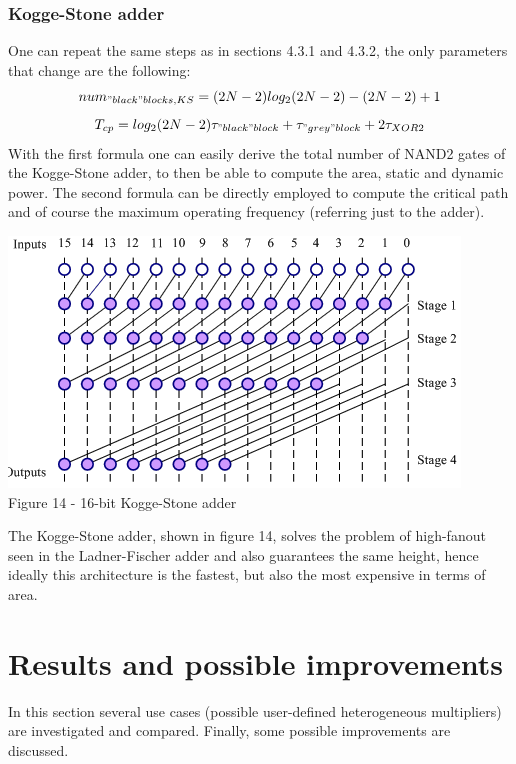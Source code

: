 \documentclass[11pt]{article} %
\begin{document}
\subsubsection{Kogge-Stone adder}
One can repeat the same steps as in sections 4.3.1  and 4.3.2, the only parameters that change are the following:
$$ num_{"black"blocks,KS} = (2N-2)log_2 (2N-2) - (2N-2) +1$$
$$ T_{cp} = log_2(2N-2) \tau_{"black"block} + \tau_{"grey"block} + 2 \tau_{XOR2}$$
With the first formula one can easily derive the total number of NAND2 gates of the Kogge-Stone adder, to then be able to compute the area, static and dynamic power. The second formula can be directly employed to compute the critical path and of course the maximum operating frequency (referring just to the adder).\\
\vspace{1em}
\begin{center}
\includegraphics[scale=.80]{kogge.PNG}\\
\small{Figure 14 - 16-bit Kogge-Stone adder}
\end{center}
\vspace{1em}
The Kogge-Stone adder, shown in figure 14, solves the problem of high-fanout seen in the Ladner-Fischer adder and also guarantees the same height, hence ideally this architecture is the fastest, but also the most expensive in terms of area.
\newpage
\section{Results and possible improvements}
In this section several use cases (possible user-defined heterogeneous multipliers) are investigated and compared. Finally, some possible improvements are discussed.
\vspace{2em}
\end{document}
